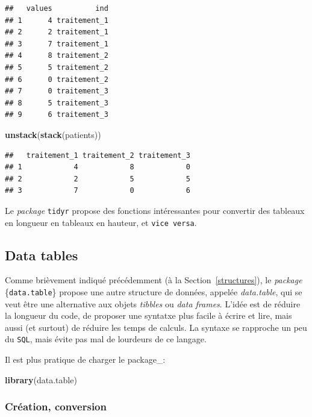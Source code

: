 \documentclass[
  11pt,
]{book}
\newenvironment{Shaded}{\begin{snugshade}}{\end{snugshade}}
\newcommand{\KeywordTok}[1]{\textcolor[rgb]{0.13,0.29,0.53}{\textbf{#1}}}
\newcommand{\NormalTok}[1]{#1}
\numberwithin{equation}{section}
\numberwithin{countremarque}{section}
\begin{document}
\begin{lstlisting}
##   values          ind
## 1      4 traitement_1
## 2      2 traitement_1
## 3      7 traitement_1
## 4      8 traitement_2
## 5      5 traitement_2
## 6      0 traitement_2
## 7      0 traitement_3
## 8      5 traitement_3
## 9      6 traitement_3
\end{lstlisting}

\begin{Shaded}
\begin{Highlighting}[]
\KeywordTok{unstack}\NormalTok{(}\KeywordTok{stack}\NormalTok{(patients))}
\end{Highlighting}
\end{Shaded}

\begin{lstlisting}
##   traitement_1 traitement_2 traitement_3
## 1            4            8            0
## 2            2            5            5
## 3            7            0            6
\end{lstlisting}

Le \emph{package} \texttt{tidyr} propose des fonctions intéressantes pour convertir des tableaux en longueur en tableaux en hauteur, et \texttt{vice\ versa}.

\hypertarget{data-tables}{%
\subsection{Data tables}\label{data-tables}}

Comme brièvement indiqué précédemment (à la Section~\ref{structures}), le \emph{package} \{\texttt{data.table}\} propose une autre structure de données, appelée \emph{data.table}, qui se veut être une alternative aux objets \emph{tibbles} ou \emph{data frames}. L'idée est de réduire la longueur du code, de proposer une syntatxe plus facile à écrire et lire, mais aussi (et surtout) de réduire les temps de calculs. La syntaxe se rapproche un peu du \texttt{SQL}, mais évite pas mal de lourdeurs de ce langage.

Il est plus pratique de charger le package\_:

\begin{Shaded}
\begin{Highlighting}[]
\KeywordTok{library}\NormalTok{(data.table)}
\end{Highlighting}
\end{Shaded}

\hypertarget{cruxe9ation-conversion}{%
\subsubsection{Création, conversion}\label{cruxe9ation-conversion}}
\end{document}
